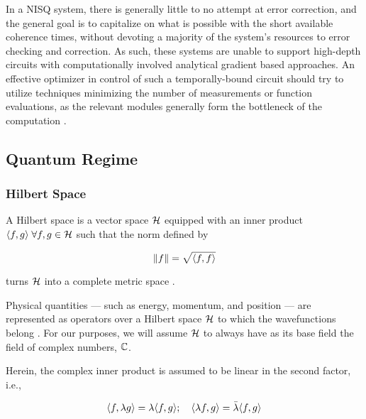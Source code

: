 In a NISQ system, there is generally little to no attempt at error correction,
and the general goal is to capitalize on what is possible with the short
available coherence times, without devoting a majority of the system's resources
to error checking and correction. As such, these systems are unable to support
high-depth circuits with computationally involved analytical gradient based
approaches. An effective optimizer in control of such a temporally-bound circuit
should try to utilize techniques minimizing the number of measurements or
function evaluations, as the relevant modules generally form the bottleneck of
the computation \cite[see][chapter II.D]{bharti2021noisy}.

\subsection{Quantum Regime}

\subsubsection{Hilbert Space}
\begin{definition}
    A Hilbert space is a vector space \(\mathcal{H}\) equipped with an inner
    product \(\langle f, g\rangle \;\forall f, g \in \mathcal{H}\) such that
    the norm defined by

    \begin{equation*}
        \norm{f} = \sqrt{\langle f, f\rangle}
    \end{equation*}

    turns \(\mathcal{H}\) into a complete metric space
    \cite{sansone1959orthogonal}.
\end{definition}

Physical quantities --- such as energy, momentum, and position --- are
represented as operators over a Hilbert space \(\mathcal{H}\) to which the
wavefunctions belong \cite{hall2013quantum}. 
For our purposes, we will assume \(\mathcal{H}\) to always
have as its base field the field of complex numbers, \(\mathbb{C}\).

Herein, the complex inner product is assumed to be linear in the second factor,
i.e.,

\begin{equation*}
    \langle f, \lambda g\rangle = \lambda \langle f, g\rangle; \quad \langle \lambda f, g\rangle = \bar{\lambda} \langle f, g\rangle
\end{equation*}

